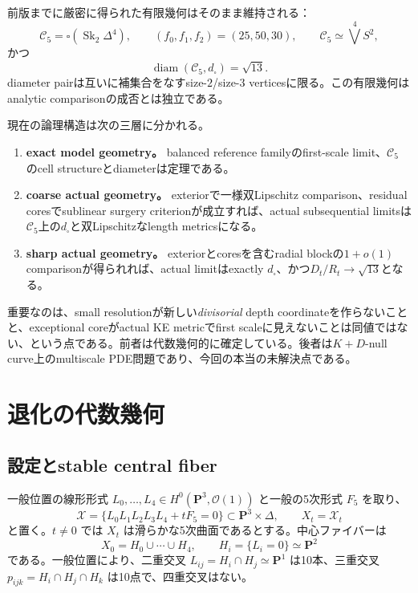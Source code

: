 \documentclass[11pt,a4paper]{ltjsarticle}
\theoremstyle{definition}
\theoremstyle{remark}
\newcommand{\PP}{\mathbf P}
\newcommand{\Sk}{\operatorname{Sk}}
\newcommand{\diam}{\operatorname{diam}}
\begin{document}
前版までに厳密に得られた有限幾何はそのまま維持される：
\[
 \mathcal C_5=\square(\Sk_2\Delta^4),\qquad
 (f_0,f_1,f_2)=(25,50,30),\qquad
 \mathcal C_5\simeq\bigvee^4S^2,
\]
かつ
\[
 \diam(\mathcal C_5,d_\square)=\sqrt{13}.
\]
diameter pairは互いに補集合をなすsize-$2$/size-$3$ verticesに限る。この有限幾何はanalytic comparisonの成否とは独立である。

現在の論理構造は次の三層に分かれる。
\begin{enumerate}[label=(L\arabic*),leftmargin=3em]
\item \textbf{exact model geometry。} balanced reference familyのfirst-scale limit、$\mathcal C_5$ のcell structureとdiameterは定理である。
\item \textbf{coarse actual geometry。} exteriorで一様双Lipschitz comparison、residual coresでsublinear surgery criterionが成立すれば、actual subsequential limitsは$\mathcal C_5$上の$d_\square$と双Lipschitzなlength metricsになる。
\item \textbf{sharp actual geometry。} exteriorとcoresを含むradial blockの$1+o(1)$ comparisonが得られれば、actual limitはexactly $d_\square$、かつ$D_t/R_t\to\sqrt{13}$となる。
\end{enumerate}

重要なのは、small resolutionが新しい\emph{divisorial} depth coordinateを作らないことと、exceptional coreがactual KE metricでfirst scaleに見えないことは同値ではない、という点である。前者は代数幾何的に確定している。後者は$K+D$-null curve上のmultiscale PDE問題であり、今回の本当の未解決点である。

\section{退化の代数幾何}

\subsection{設定とstable central fiber}

一般位置の線形形式 $L_0,\dots,L_4\in H^0(\PP^3,\mathcal O(1))$ と一般の5次形式 $F_5$ を取り、
\begin{equation}\label{eq:family}
 \mathcal X=\{L_0L_1L_2L_3L_4+tF_5=0\}
 \subset\PP^3\times\Delta,
 \qquad X_t=\mathcal X_t
\end{equation}
と置く。$t\neq0$ では $X_t$ は滑らかな5次曲面であるとする。中心ファイバーは
\[
 X_0=H_0\cup\cdots\cup H_4,
 \qquad H_i=\{L_i=0\}\simeq\PP^2
\]
である。一般位置により、二重交叉
$L_{ij}=H_i\cap H_j\simeq\PP^1$ は10本、三重交叉
$p_{ijk}=H_i\cap H_j\cap H_k$ は10点で、四重交叉はない。
\end{document}
